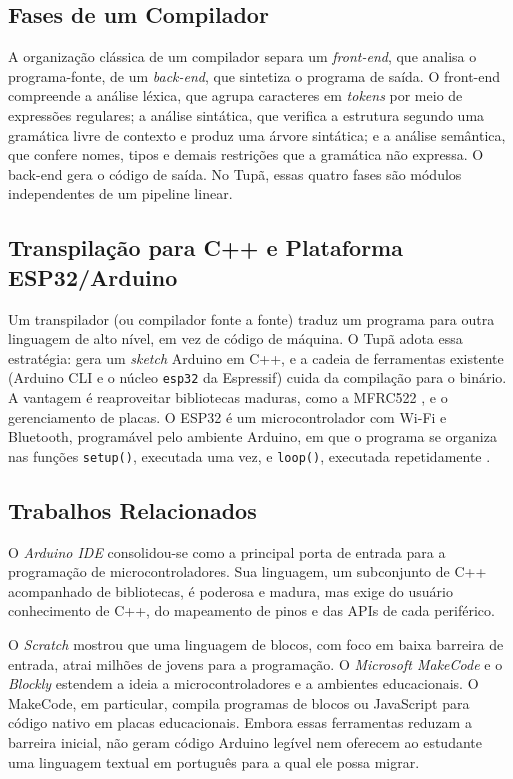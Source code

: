 \documentclass[conference]{IEEEtran}
\begin{document}
\subsection{Fases de um Compilador}
A organização clássica de um compilador \cite{aho} separa um \emph{front-end},
que analisa o programa-fonte, de um \emph{back-end}, que sintetiza o programa
de saída. O front-end compreende a análise léxica, que agrupa caracteres em
\textit{tokens} por meio de expressões regulares; a análise sintática, que
verifica a estrutura segundo uma gramática livre de contexto e produz uma
árvore sintática; e a análise semântica, que confere nomes, tipos e demais
restrições que a gramática não expressa. O back-end gera o código de saída. No
Tupã, essas quatro fases são módulos independentes de um pipeline linear.

\subsection{Transpilação para C++ e Plataforma ESP32/Arduino}
Um transpilador (ou compilador fonte a fonte) traduz um programa para outra
linguagem de alto nível, em vez de código de máquina. O Tupã adota essa
estratégia: gera um \textit{sketch} Arduino em C++, e a cadeia de ferramentas
existente (Arduino CLI \cite{arduinocli} e o núcleo \texttt{esp32} da
Espressif) cuida da compilação para o binário. A vantagem é reaproveitar
bibliotecas maduras, como a MFRC522 \cite{mfrc522}, e o gerenciamento de
placas. O ESP32 \cite{esp32} é um microcontrolador com Wi-Fi e Bluetooth,
programável pelo ambiente Arduino, em que o programa se organiza nas funções
\texttt{setup()}, executada uma vez, e \texttt{loop()}, executada
repetidamente \cite{arduino}.

\subsection{Trabalhos Relacionados}
O \textit{Arduino IDE} \cite{arduino} consolidou-se como a principal porta de
entrada para a programação de microcontroladores. Sua linguagem, um
subconjunto de C++ acompanhado de bibliotecas, é poderosa e madura, mas exige
do usuário conhecimento de C++, do mapeamento de pinos e das APIs de cada
periférico.

O \textit{Scratch} \cite{scratch} mostrou que uma linguagem de blocos, com
foco em baixa barreira de entrada, atrai milhões de jovens para a programação.
O \textit{Microsoft MakeCode} \cite{makecode} e o \textit{Blockly}
\cite{blockly} estendem a ideia a microcontroladores e a ambientes
educacionais. O MakeCode, em particular, compila programas de blocos ou
JavaScript para código nativo em placas educacionais. Embora essas
ferramentas reduzam a barreira inicial, não geram código Arduino legível nem
oferecem ao estudante uma linguagem textual em português para a qual ele possa
migrar.
\end{document}
